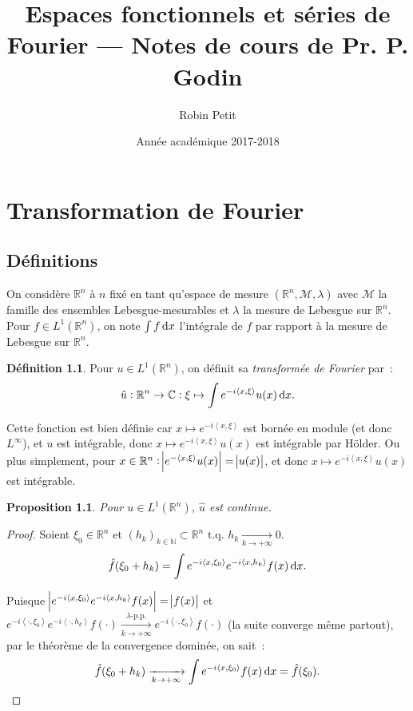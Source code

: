 \documentclass{report}
\title{Espaces fonctionnels et séries de Fourier --- Notes de cours de Pr. P. Godin}
\author{Robin Petit}
\date{Année académique 2017-2018}
\newcommand{\C}{{\mathbb C}}
\newcommand{\R}{{\mathbb R}}
\newcommand{\N}{{\mathbb N}}
\newcommand{\scpr}[2]{\left\langle#1, #2\right\rangle}
\newcommand{\tq}{\text{ t.q. }}
\newcommand{\pinfty}{{+\infty}}
\newtheorem{prp}[thm]{Proposition}
\theoremstyle{definition}
\newtheorem{déf}[thm]{Définition}
\theoremstyle{remark}
\begin{document}
\maketitle
\tableofcontents
\setcounter{page}{1}

\chapter{Transformation de Fourier}

\section{Définitions}

On considère $\R^n$ à $n$ fixé en tant qu'espace de mesure $(\R^n, \mathcal M, \lambda)$ avec $\mathcal M$ la famille des ensembles Lebesgue-mesurables et $\lambda$
la mesure de Lebesgue sur $\R^n$. Pour $f \in L^1(\R^n)$, on note $\int f\dif x$ l'intégrale de $f$ par rapport à la mesure de Lebesgue sur $\R^n$.

\begin{déf}\label{déf:Fourier dans L^1} Pour $u \in L^1(\R^n)$, on définit sa \textit{transformée de Fourier} par~:
\begin{equation}
	\hat u : \R^n \to \C : \xi \mapsto \int e^{-i\scpr x\xi}u(x)\dif x.
\end{equation}
\end{déf}

Cette fonction est bien définie car $x \mapsto e^{-i\scpr x\xi}$ est bornée en module (et donc $L^\infty$), et $u$ est intégrable, donc $x \mapsto e^{-i\scpr x\xi}u(x)$ est intégrable
par Hölder. Ou plus simplement, pour $x \in \R^n : \abs {e^{-\scpr x\xi}u(x)} = \abs {u(x)}$, et donc $x \mapsto e^{-i\scpr x\xi}u(x)$ est intégrable.

\begin{prp} Pour $u \in L^1(\R^n)$, $\hat u$ est continue.
\end{prp}

\begin{proof} Soient $\xi_0 \in \R^n$ et $(h_k)_{k \in \N} \subset \R^n \tq h_k \xrightarrow[k \to \pinfty]{} 0$.
\[\hat f(\xi_0 + h_k) = \int e^{-i\scpr x{\xi_0}}e^{-i\scpr x{h_k}}f(x)\dif x.\]

Puisque $\abs {e^{-i\scpr x{\xi_0}}e^{-i\scpr x{h_k}}f(x)} = \abs {f(x)}$ et
$e^{-i\scpr \cdot{\xi_0}}e^{-i\scpr \cdot{h_k}}f(\cdot) \xrightarrow[k \to \pinfty]{\lambda\text{-p.p.}}e^{-i\scpr \cdot{\xi_0}}f(\cdot)$ (la suite converge même partout),
par le théorème de la convergence dominée, on sait~:
\[\hat f(\xi_0 + h_k) \xrightarrow[k \to \pinfty]{} \int e^{-i\scpr x{\xi_0}}f(x)\dif x = \hat f(\xi_0).\]
\end{proof}
\vspace{1cm}
\end{document}
